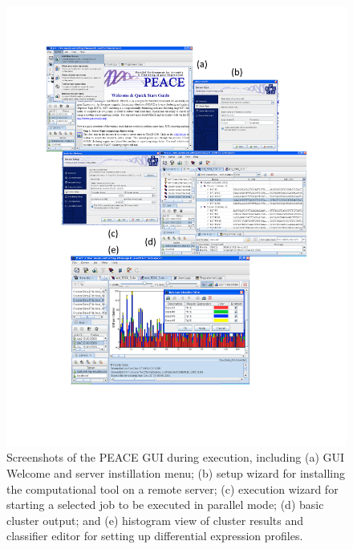 \documentclass[a4,center,fleqn]{NAR}
\begin{document}
\begin{figure}[b]
\centerline{
\includegraphics[trim=0cm 3cm 0cm 1cm, clip, scale=0.9]{screen.d/screen.pdf} 
}
\label{screen}
\caption{Screenshots of the PEACE GUI during execution, including (a)
GUI Welcome and server instillation menu; (b) setup wizard for
installing the computational tool on a remote server; (c) execution
wizard for starting a selected job to be executed in parallel mode;
(d) basic cluster output; and (e) histogram view of cluster results
and classifier editor for setting up differential expression profiles.}
\end{figure}
\end{document}
